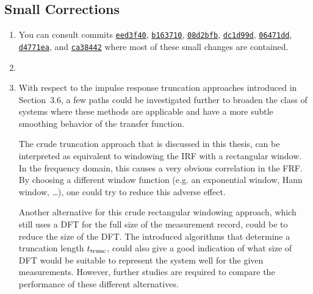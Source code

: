 \documentclass{responseletter}
\newcommand{\commit}[1]{\href{https://github.com/egeerardyn/phdthesis/commit/#1}{\texttt{#1}}}
\begin{document}
\subsection{Small Corrections}

\begin{enumerate}

\item {}
You can consult commits
  \commit{eed3f40}, 
  \commit{b163710}, 
  \commit{08d2bfb},  
  \commit{dc1d99d}, 
  \commit{06471dd}, 
  \commit{d4771ea}, and
  \commit{ca38442} where most of these small changes are contained.

\item {}

\item {}
\begin{newquote}
    With respect to the impulse response truncation approaches introduced in Section~3.6, a few paths could be investigated further to broaden the class of systems where these methods are applicable and have a more subtle smoothing behavior of the transfer function.

    The crude truncation approach that is discussed in this thesis, can be interpreted as equivalent to windowing the \gls{IRF} with a rectangular window.
    In the frequency domain, this causes a very obvious correlation in the \gls{FRF}.
    By choosing a different window function (e.g. an exponential window, Hann window, \ldots), one could try to reduce this adverse effect.

   Another alternative for this crude rectangular windowing approach, which still uses a \gls{DFT} for the full size of the measurement record, could be to reduce the size of the \gls{DFT}.
   The introduced algorithms that determine a truncation length $t_{\mathrm{trunc}}$, could also give a good indication of what size of \gls{DFT} would be suitable to represent the system well for the given measurements.
   However, further studies are required to compare the performance of these different alternatives.


\end{newquote}
\end{enumerate}
\end{document}
